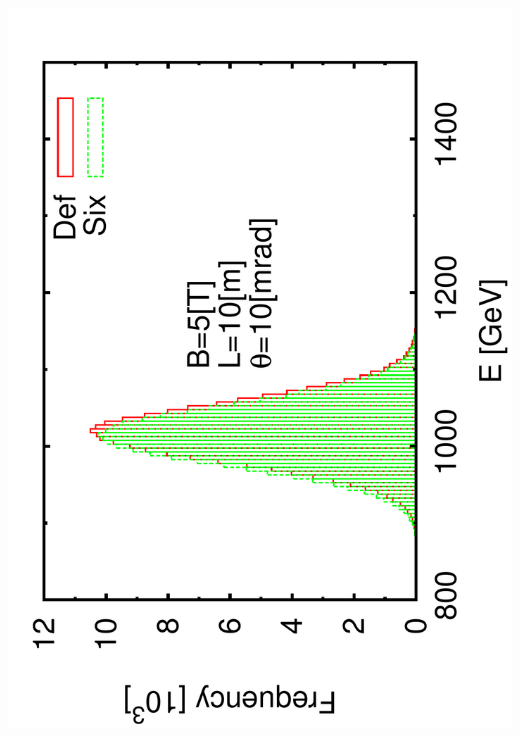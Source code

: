 \documentclass{beamer}
\begin{document}
\begin{frame}
 \includegraphics[scale=0.24,angle=-90]{histogram1e-2.pdf}

\end{frame}
\end{document}
